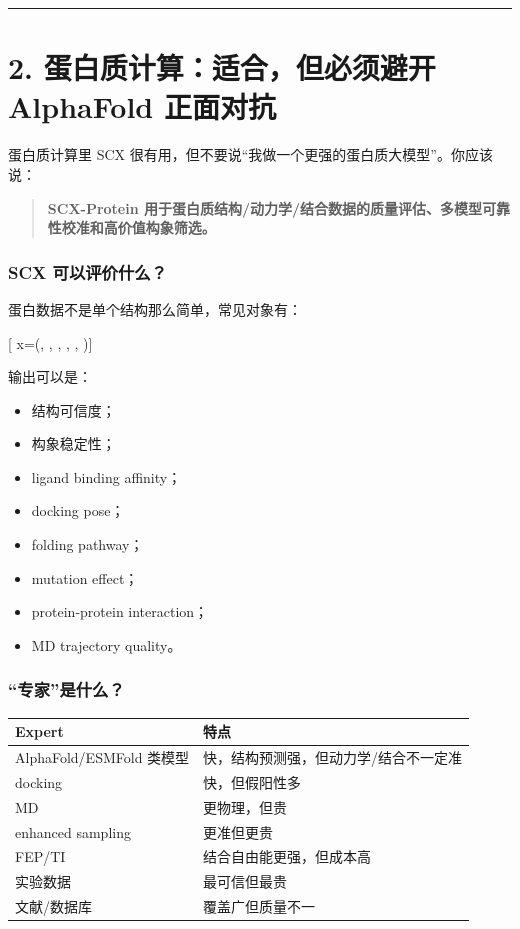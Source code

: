 \documentclass[
  12pt,
]{ctexart}
\providecommand{\tightlist}{%
  \setlength{\itemsep}{0pt}\setlength{\parskip}{0pt}}
\begin{document}
\begin{center}\rule{0.5\linewidth}{0.5pt}\end{center}

\section{2. 蛋白质计算：适合，但必须避开 AlphaFold
正面对抗}\label{ux86cbux767dux8d28ux8ba1ux7b97ux9002ux5408ux4f46ux5fc5ux987bux907fux5f00-alphafold-ux6b63ux9762ux5bf9ux6297}

蛋白质计算里 SCX
很有用，但不要说``我做一个更强的蛋白质大模型''。你应该说：

\begin{quote}
\textbf{SCX-Protein
用于蛋白质结构/动力学/结合数据的质量评估、多模型可靠性校准和高价值构象筛选。}
\end{quote}

\subsubsection{SCX
可以评价什么？}\label{scx-ux53efux4ee5ux8bc4ux4ef7ux4ec0ux4e48}

蛋白数据不是单个结构那么简单，常见对象有：

{[} x=(, , ,
, , ){]}

输出可以是：

\begin{itemize}
\tightlist
\item
  结构可信度；
\item
  构象稳定性；
\item
  ligand binding affinity；
\item
  docking pose；
\item
  folding pathway；
\item
  mutation effect；
\item
  protein-protein interaction；
\item
  MD trajectory quality。
\end{itemize}

\subsubsection{``专家''是什么？}\label{ux4e13ux5bb6ux662fux4ec0ux4e48}

\begin{longtable}[]{@{}ll@{}}
\toprule\noalign{}
Expert & 特点 \\
\midrule\noalign{}
\endhead
\bottomrule\noalign{}
\endlastfoot
AlphaFold/ESMFold 类模型 & 快，结构预测强，但动力学/结合不一定准 \\
docking & 快，但假阳性多 \\
MD & 更物理，但贵 \\
enhanced sampling & 更准但更贵 \\
FEP/TI & 结合自由能更强，但成本高 \\
实验数据 & 最可信但最贵 \\
文献/数据库 & 覆盖广但质量不一 \\
\end{longtable}
\end{document}
